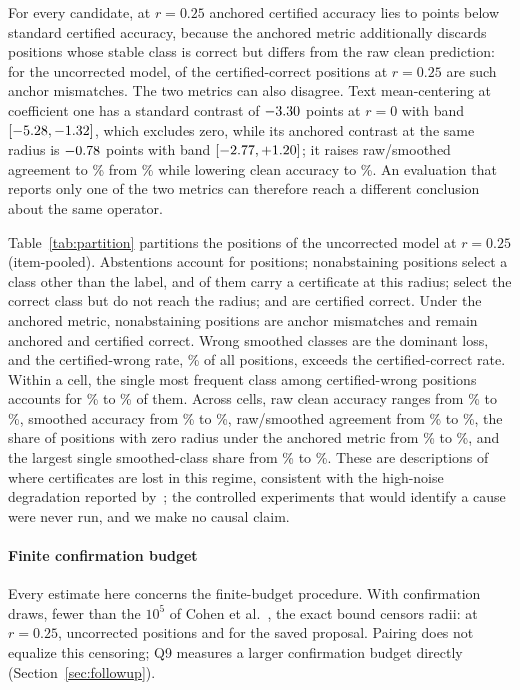 For every candidate, at $r=0.25$ anchored certified accuracy lies \StdAnchGapMin{} to
\StdAnchGapMax{} points below standard certified accuracy, because the anchored
metric additionally discards positions whose stable class is correct but
differs from the raw clean prediction: for the uncorrected model,
\CertifiedCorrectAnchorMismatch{} of the \PartCertifiedCorrect{}
certified-correct positions at $r=0.25$ are such anchor mismatches. The two
metrics can also disagree. Text mean-centering at
coefficient one has a standard contrast of $-3.30$ points at $r=0$
with band $[-5.28,-1.32]$, which excludes zero, while
its anchored contrast at the same radius is $-0.78$ points with
band $[-2.77,+1.20]$; it raises raw/smoothed
agreement to \GMCAgreement\% from \NoCorrAgreement\% while lowering clean
accuracy to \GMCClean\%. An evaluation that reports only one of the two metrics
can therefore reach a different conclusion about the same operator.



Table~\ref{tab:partition} partitions the \ExpPositions{} positions of the
uncorrected model at $r=0.25$ (item-pooled). Abstentions account for
\PartAbstain{} positions; \PartWrongClass{} nonabstaining positions select a
class other than the label, and \PartCertifiedWrong{} of them carry a
certificate at this radius; \PartCorrectBelowRadius{} select the correct class
but do not reach the radius; and \PartCertifiedCorrect{} are certified correct.
Under the anchored metric, \PartAnchorMismatch{} nonabstaining positions are
anchor mismatches and \PartAnchoredCorrect{} remain anchored and certified
correct. Wrong smoothed classes are the dominant loss, and the certified-wrong
rate, \CertifiedWrongRate\% of all positions, exceeds the certified-correct
rate. Within a cell, the single most frequent class among certified-wrong
positions accounts for \CWTopClassShareLo\% to \CWTopClassShareHi\% of them.
Across cells, raw clean accuracy ranges from \RangeCleanLo\% to
\RangeCleanHi\%, smoothed accuracy from \RangeSmoothedLo\% to
\RangeSmoothedHi\%, raw/smoothed agreement from \RangeAgreementLo\% to
\RangeAgreementHi\%, the share of positions with zero radius under the anchored
metric from \RangeZeroRadiusLo\% to \RangeZeroRadiusHi\%, and the largest
single smoothed-class share from \RangeTopClassLo\% to \RangeTopClassHi\%.
These are descriptions of where certificates are lost in this regime,
consistent with the high-noise degradation reported by~\cite{nirala2024ovc};
the controlled experiments that would identify a cause were never run, and we
make no causal claim.

\paragraph{Finite confirmation budget}
Every estimate here concerns the finite-budget procedure. With
\ExpConfDraws{} confirmation draws, fewer than the $10^5$ of Cohen et
al.~\cite{cohen2019smoothing}, the exact bound censors radii: at $r=0.25$,
\CensoredNoCorrRQuarter{} uncorrected positions and \CensoredSavedRQuarter{}
for the saved proposal. Pairing does not equalize this censoring; Q9 measures
a larger confirmation budget directly (Section~\ref{sec:followup}).
